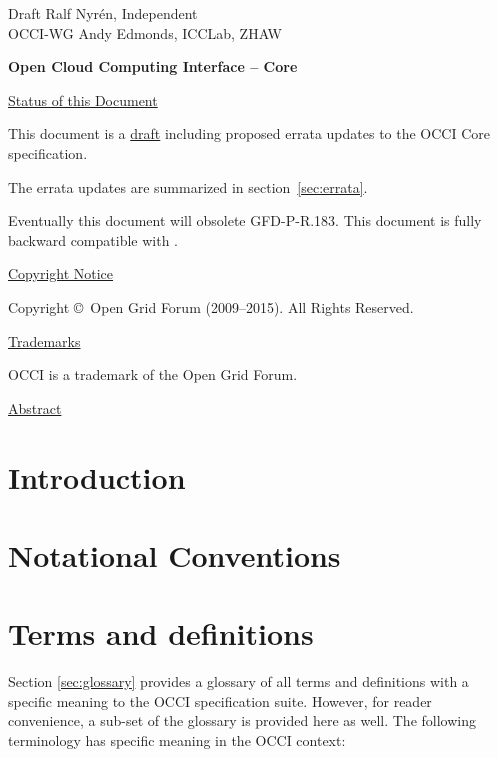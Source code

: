 \documentclass[10pt,a4paper]{article}
\begin{document}
\thispagestyle{empty}

Draft \hfill  {Ralf Nyrén, Independent}\\
OCCI-WG \hfill  Andy Edmonds, ICCLab, ZHAW
\\

\vspace*{0.5in}

\begin{Large}
\textbf{Open Cloud Computing Interface -- Core}
\end{Large}

\vspace*{0.5in}

\underline{Status of this Document}

% 

This document is a \underline{draft} including proposed errata updates to the
OCCI Core \cite{occi:core} specification.

The errata updates are summarized in section~\ref{sec:errata}.

Eventually this document will obsolete GFD-P-R.183. This document is fully backward compatible with \cite{occi:core}.

\underline{Copyright Notice}

Copyright \copyright{}~Open Grid Forum (2009--2015). All Rights Reserved.

\underline{Trademarks}

OCCI is a trademark of the Open Grid Forum.

\underline{Abstract}



\newpage
\tableofcontents
\newpage

\section{Introduction}


\section{Notational Conventions}


\section{Terms and definitions}
Section \ref{sec:glossary} provides a glossary of all terms and
definitions with a specific meaning to the OCCI specification
suite. However, for reader convenience, a sub-set of the glossary is
provided here as well. The following terminology has specific meaning
in the OCCI context:
\end{document}
